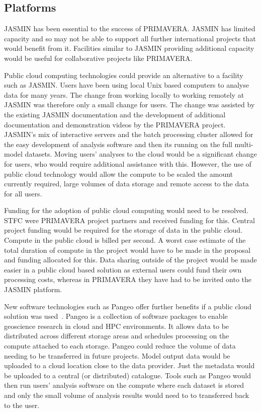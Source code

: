 \documentclass[gmd, manuscript]{copernicus}
\begin{document}
\subsection{Platforms}

JASMIN has been essential to the success of PRIMAVERA. JASMIN has limited capacity and so may not be able to support all further international projects that would benefit from it. Facilities similar to JASMIN providing additional capacity would be useful for collaborative projects like PRIMAVERA.

Public cloud computing technologies could provide an alternative to a facility such as JASMIN. Users have been using local Unix based computers to analyse data for many years. The change from working locally to working remotely at JASMIN was therefore only a small change for users. The change was assisted by the existing JASMIN documentation and the development of additional documentation and demonstration videos by the PRIMAVERA project. JASMIN's mix of interactive servers and the batch processing cluster allowed for the easy development of analysis software and then its running on the full multi-model datasets. Moving users' analyses to the cloud would be a significant change for users, who would require additional assistance with this. However, the use of public cloud technology would allow the compute to be scaled the amount currently required, large volumes of data storage and remote access to the data for all users.

Funding for the adoption of public cloud computing would need to be resolved. STFC were PRIMAVERA project partners and received funding for this. Central project funding would be required for the storage of data in the public cloud. Compute in the public cloud is billed per second. A worst case estimate of the total duration of compute in the project would have to be made in the proposal and funding allocated for this. Data sharing outside of the project would be made easier in a public cloud based solution as external users could fund their own processing costs, whereas in PRIMAVERA they have had to be invited onto the JASMIN platform.

New software technologies such as Pangeo offer further benefits if a public cloud solution was used~\citep{Pangeo}. Pangeo is a collection of software packages to enable geoscience research in cloud and HPC environments. It allows data to be distributed across different storage areas and schedules processing on the compute attached to each storage. Pangeo could reduce the volume of data needing to be transferred in future projects. Model output data would be uploaded to a cloud location close to the data provider. Just the metadata would be uploaded to a central (or distributed) catalogue. Tools such as Pangeo would then run users' analysis software on the compute where each dataset is stored and only the small volume of analysis results would need to to transferred back to the user.
\end{document}
